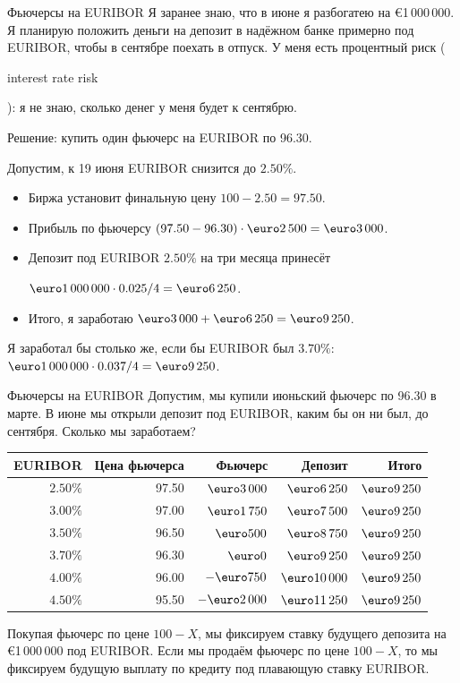 \documentclass{beamer}
\renewcommand{\EUR}[1]{\textup{\euro}#1}
\newcommand{\en}[1]{\begin{otherlanguage}{english}#1\end{otherlanguage}}
\begin{document}
\begin{frame}{Фьючерсы на EURIBOR}
\justify
Я заранее знаю, что в июне я разбогатею на \EUR{1\,000\,000}. Я планирую положить деньги на депозит в надёжном банке примерно под EURIBOR, чтобы в сентябре поехать в отпуск. У меня есть \alert{процентный риск} (\en{interest rate risk}): я не знаю, сколько денег у меня будет к сентябрю.

\justify
Решение: купить один фьючерс на EURIBOR по 96.30.

\justify
Допустим, к 19 июня EURIBOR снизится до $2.50\%$.
\begin{itemize}
\justifying
\item Биржа установит финальную цену $100 - 2.50 = 97.50$.
\item Прибыль по фьючерсу $(97.50-96.30)\cdot\EUR{2\,500} = \EUR{3\,000}$.
\item Депозит под EURIBOR $2.50\%$ на три месяца принесёт

$\EUR{1\,000\,000} \cdot 0.025 / 4 = \EUR{6\,250}$.
\item Итого, я заработаю $\EUR{3\,000} + \EUR{6\,250} = \EUR{9\,250}$.
\end{itemize} 

\justify
Я заработал бы столько же, если бы EURIBOR был $3.70\%$: $\EUR{1\,000\,000} \cdot 0.037/4 =\EUR{9\,250}$.
\end{frame}



\begin{frame}{Фьючерсы на EURIBOR}
\justify
Допустим, мы купили июньский фьючерс по 96.30 в марте. В июне мы открыли депозит под
EURIBOR, каким бы он ни был, до сентября. Сколько мы заработаем?

\justify
\centering
\begin{tabular}{r|r|r|r|r}
EURIBOR   & Цена фьючерса & Фьючерс         & Депозит & Итого \\ \hline
$2.50\%$ & 97.50        & $\EUR{3\,000}$ & $\EUR{6\,250}$  & $\EUR{9\,250}$ \\
$3.00\%$ & 97.00        & $\EUR{1\,750}$ & $\EUR{7\,500}$  & $\EUR{9\,250}$ \\
$3.50\%$ & 96.50        & $\EUR{500}$    & $\EUR{8\,750}$  & $\EUR{9\,250}$ \\
$3.70\%$ & 96.30        & $\EUR{0}$       & $\EUR{9\,250}$  & $\EUR{9\,250}$ \\
$4.00\%$ & 96.00        & $-\EUR{750}$    & $\EUR{10\,000}$ & $\EUR{9\,250}$ \\
$4.50\%$ & 95.50        & $-\EUR{2\,000}$ & $\EUR{11\,250}$ & $\EUR{9\,250}$
\end{tabular}

\justify
Покупая фьючерс по цене $100-X$, мы фиксируем ставку будущего депозита на \EUR{1\,000\,000} под EURIBOR. Если мы продаём фьючерс по цене $100-X$, то мы фиксируем будущую выплату по кредиту под плавающую ставку EURIBOR.
\end{frame}
\end{document}
